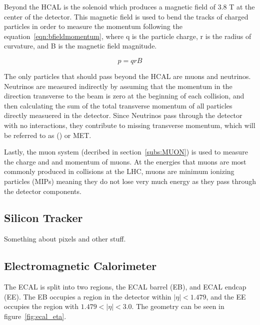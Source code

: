 Beyond the HCAL is the solenoid which produces a magnetic field of 3.8 T at the center of the detector.
This magnetic field is used to bend the tracks of charged particles in order to measure the momentum following the equation~\ref{eqn:bfieldmomentum},
where q is the particle charge, r is the radius of curvature, and B is the magnetic field magnitude.

\begin{equation}
  \label{eqn:bfieldmomentum}
p = qrB
\end{equation}

The only particles that should pass beyond the HCAL are muons and neutrinos.
Neutrinos are measured indirectly by assuming that the momentum in the direction transverse to the beam is zero at the beginning of each collision,
and then calculating the sum of the total transverse momentum of all particles directly measuered in the detector.
Since Neutrinos pass through the detector with no interactions, they contribute to missing transverse momentum, which will be referred to as (\MET) or MET.

Lastly, the muon system (decribed in section~\ref{subs:MUON}) is used to measure the charge and and momentum of muons.
At the energies that muons are most commonly produced in collisions at the LHC, muons are minimum ionizing particles (MIPs)
meaning they do not lose very much energy as they pass through the detector components.

\subsection{Silicon Tracker}
\label {subs:tracker}
Something about pixels and other stuff.

\subsection{Electromagnetic Calorimeter}
\label {subs:ECAL}
The ECAL is split into two regions, the ECAL barrel (EB), and ECAL endcap (EE).
The EB occupies a region in the detector within $|\eta| < 1.479$, and the EE occupies the region with $1.479 < |\eta| < 3.0$.
The geometry can be seen in figure~\ref{fig:ecal_eta}.

